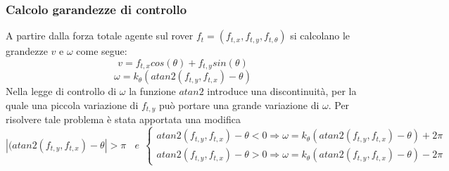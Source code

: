 \subsubsection{Calcolo garandezze di controllo}
A partire dalla forza totale agente sul rover $f_t=(f_{t,x}, f_{t,y}, f_{t,\theta})$ si calcolano le grandezze $v$ e $\omega$ come segue:
\begin{equation}
    v=f_{t,x} cos(\theta) + f_{t,y} sin (\theta)
\end{equation}
\begin{equation}
    \omega= k_{\theta}(atan2(f_{t,y}, f_{t,x})-\theta)
\end{equation}
Nella legge di controllo di $\omega$ la funzione $atan2$ introduce una discontinuità, per la quale una piccola variazione di $f_{t,y}$ può portare una grande variazione di $\omega$. Per risolvere tale problema è stata apportata una modifica
\begin{equation*} 
|(atan2(f_{t,y}, f_{t,x})-\theta|>\pi \ \ \ \ e \ \ 
\begin{cases}

    atan2(f_{t,y}, f_{t,x})-\theta<0  \Rightarrow{\omega= k_{\theta}(atan2(f_{t,y}, f_{t,x})-\theta)+2\pi} 
   \\
    atan2(f_{t,y}, f_{t,x})-\theta>0  \Rightarrow{\omega= k_{\theta}(atan2(f_{t,y}, f_{t,x})-\theta)-2\pi} 
  \end{cases} 
\end{equation*}
 

